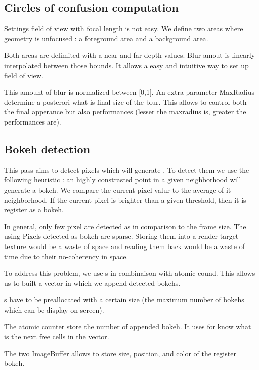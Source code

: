\subsection{Circles of confusion computation}
Settings field of view with focal length is not easy.
We define two areas where geometry is unfocused : a foreground area and a background area.

Both areas are delimited with a near and far depth values. Blur amout is linearly interpolated between those bounds. It allows a easy and intuitive way to set up field of view.

This amount of blur is normalized between [0,1]. An extra parameter MaxRadius determine a posterori what is final size of the blur.
This allows to control both the final apperance but also performances (lesser the maxradius is, greater the performances are).


\subsection{Bokeh detection}
This pass aims to detect pixels which will generate \bokehs. To detect them we use the following heuristic : an highly constrasted point in a given neighborhood will generate a bokeh.
We compare the current pixel valur to the average of it neighborhood. If the current pixel is brighter than a given threshold, then it is register as a bokeh.

In general, only few pixel are detected as \bokeh in comparison to the frame size. The using 
Pixels detected as bokeh are sparse. Storing them into a render target texture would be a waste of space and reading them back would be a waste of time due to their no-coherency in space.

To address this problem, we use \opengl {}s in combinaison with atomic cound. This allows us to built a vector in which we append detected bokehs.

s have to be preallocated with a certain size (\ie the maximum number of bokehs which can be display on screen).

The atomic counter store the number of appended bokeh. It uses for know what is the next free cells in the vector.

The two ImageBuffer allows to store size, position, and color of the register bokeh. 


